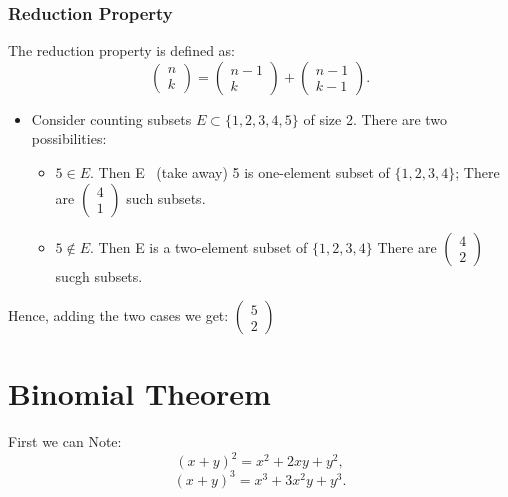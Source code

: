 \documentclass[a4paper]{article}
\numberwithin{counter}{subsection}
\theoremstyle{break}
\begin{document}
				\subsubsection{Reduction Property}%
					The reduction property is defined as:
				\[
				\begin{pmatrix} n \\ k \end{pmatrix} = \begin{pmatrix} n - 1 \\ k \end{pmatrix} + \begin{pmatrix} n - 1 \\ k -1 \end{pmatrix} 
				.\] 

				\begin{itemize}
					\item Consider counting subsets $E \subset \{1,2,3,4,5\} $ of size 2. There are two possibilities:
						\begin{itemize}
							\item $5 \in E.$ Then E  \ (take away) {5} is one-element subset of $\{1,2,3,4\} $; There are $\begin{pmatrix} 4 \\ 1 \end{pmatrix} $ such subsets. 
							\item $5 \not\in E$. Then E is a two-element subset of $\{1,2,3,4\} $ There are $\begin{pmatrix} 4 \\ 2 \end{pmatrix} $ sucgh subsets.\\ 
						\end{itemize}
				\end{itemize}

				Hence, adding the two cases we get: $\begin{pmatrix} 5 \\ 2 \end{pmatrix}$ 

				\section{Binomial Theorem}%
				
				First we can Note: \[
					(x+y)^2 = x^2 + 2xy + y^2
				,\] \[
				(x + y)^3 = x^3 + 3x^2y + y^3
				.\]  
\end{document}
